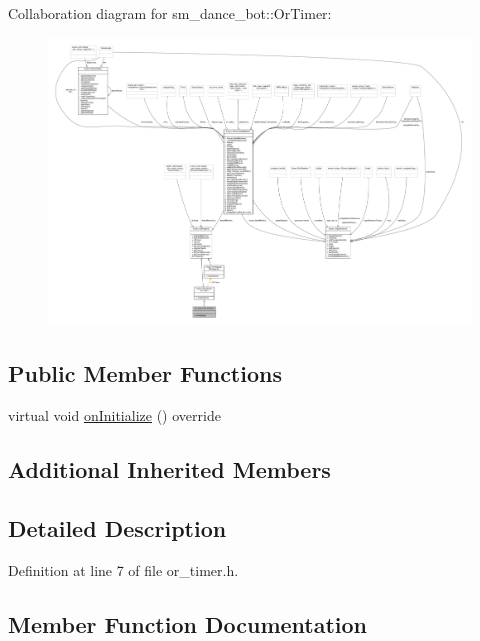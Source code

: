 Collaboration diagram for sm\+\_\+dance\+\_\+bot\+:\+:Or\+Timer\+:\nopagebreak
\begin{figure}[H]
\begin{center}
\leavevmode
\includegraphics[width=350pt]{classsm__dance__bot_1_1OrTimer__coll__graph}
\end{center}
\end{figure}
\subsection*{Public Member Functions}
\begin{DoxyCompactItemize}
\item 
virtual void \hyperlink{classsm__dance__bot_1_1OrTimer_aa0091c17ca7ff4c71badd03085272cc4}{on\+Initialize} () override
\end{DoxyCompactItemize}
\subsection*{Additional Inherited Members}


\subsection{Detailed Description}


Definition at line 7 of file or\+\_\+timer.\+h.



\subsection{Member Function Documentation}
